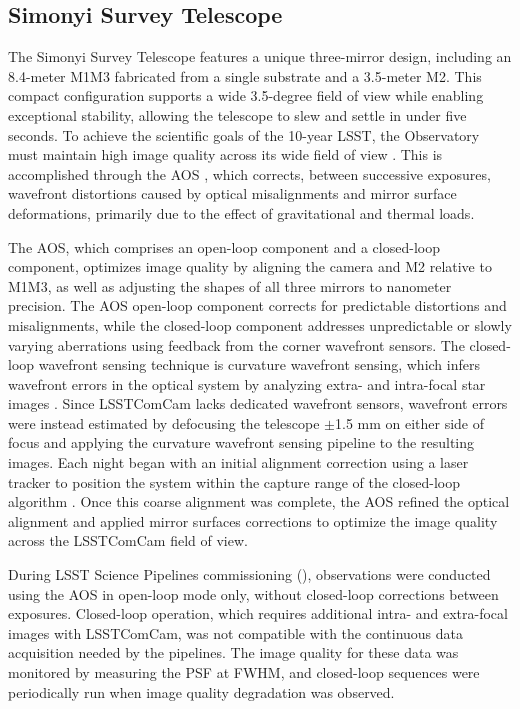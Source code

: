 \subsection{Simonyi Survey Telescope}
\label{ssec:simonyi}
The Simonyi Survey Telescope \citep{2024SPIE13094E..09S} features a unique three-mirror design, including an 8.4-meter \gls{M1M3} fabricated from a single substrate and a 3.5-meter \gls{M2}.
This compact \gls{configuration} supports a wide 3.5-degree field of view while enabling exceptional stability, allowing the telescope to slew and settle in under five seconds.
To achieve the scientific goals of the 10-year \gls{LSST}, the Observatory must maintain high image quality across its wide field of view \citep{2008arXiv0805.2366I}.
This is accomplished through the \gls{AOS} \citep{2015ApOpt..54.9045X,2024ApJ...974..108M}, which corrects, between successive exposures, wavefront distortions caused by optical misalignments and mirror surface deformations, primarily due to the effect of gravitational and thermal loads.

The \gls{AOS}, which comprises an open-loop component and a closed-loop component, optimizes image quality by aligning the camera and \gls{M2} relative to \gls{M1M3}, as well as adjusting the shapes of all three mirrors to nanometer precision.
The \gls{AOS} open-loop component corrects for predictable distortions and misalignments, while the closed-loop component addresses unpredictable or slowly varying aberrations using feedback from the corner wavefront sensors.
The closed-loop wavefront sensing technique is curvature wavefront sensing, which infers wavefront errors in the optical system by analyzing extra- and intra-focal star images \citep{2023aoel.confE..67T}.
Since \gls{LSSTComCam} lacks dedicated wavefront sensors, wavefront errors were instead estimated by defocusing the telescope $\pm$1.5 mm on either side of focus and applying the curvature wavefront sensing pipeline to the resulting images.
Each night began with an initial alignment correction using a laser tracker to position the system within the capture range of the closed-loop \gls{algorithm} \citep{2024SPIE13094E..3CM}.
Once this coarse alignment was complete, the \gls{AOS} refined the optical alignment and applied mirror surfaces corrections to optimize the image quality across the \gls{LSSTComCam} field of view.

During LSST \gls{Science Pipelines} commissioning (),  observations were conducted using the AOS in open-loop mode only, without closed-loop corrections between exposures.
Closed-loop operation, which requires additional intra- and extra-focal images with LSSTComCam, was not compatible with the continuous data acquisition needed by the pipelines.
The image quality for these data was monitored by measuring the \gls{PSF} at \gls{FWHM}, and closed-loop sequences were periodically run when image quality degradation was observed.


